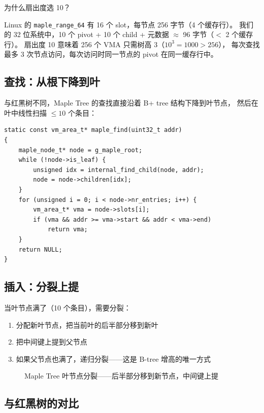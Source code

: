 \begin{whybox}
为什么扇出度选 10？

Linux 的 \texttt{maple\_range\_64} 有 16 个 slot，每节点 256 字节（4 个缓存行）。
我们的 32 位系统中，10 个 pivot + 10 个 child + 元数据 $\approx$ 96 字节（$<$ 2 个缓存行）。
扇出度 10 意味着 256 个 VMA 只需树高 3（$10^3 = 1000 > 256$），
每次查找最多 3 次节点访问，每次访问时同一节点的 pivot 在同一缓存行中。
\end{whybox}

\subsection{查找：从根下降到叶}

与红黑树不同，Maple Tree 的查找直接沿着 B+ tree 结构下降到叶节点，
然后在叶中线性扫描 $\leq 10$ 个条目：

\begin{lstlisting}[style=cstyle]
static const vm_area_t* maple_find(uint32_t addr)
{
    maple_node_t* node = g_maple_root;
    while (!node->is_leaf) {
        unsigned idx = internal_find_child(node, addr);
        node = node->children[idx];
    }
    for (unsigned i = 0; i < node->nr_entries; i++) {
        vm_area_t* vma = node->slots[i];
        if (vma && addr >= vma->start && addr < vma->end)
            return vma;
    }
    return NULL;
}
\end{lstlisting}

\subsection{插入：分裂上提}

当叶节点满了（10 个条目），需要分裂：

\begin{enumerate}
  \item 分配新叶节点，把当前叶的后半部分移到新叶
  \item 把中间键上提到父节点
  \item 如果父节点也满了，递归分裂——这是 B-tree 增高的唯一方式
\end{enumerate}

\begin{figure}[H]
  \centering
  
  \caption{Maple Tree 叶节点分裂——后半部分移到新节点，中间键上提}
  \label{fig:maple-split}
\end{figure}

\subsection{与红黑树的对比}

